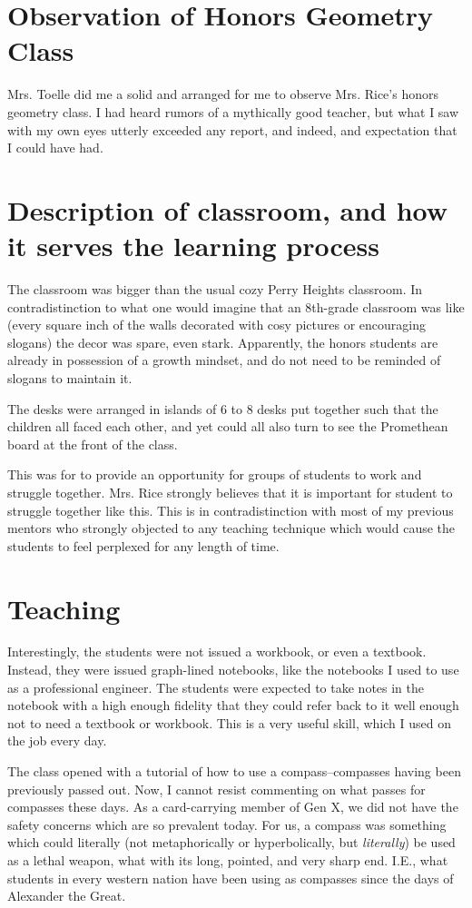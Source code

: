 \documentclass[11pt]{elegantbook}
\begin{document}
\section*{Observation of Honors Geometry Class}

Mrs. Toelle did me a solid and arranged for me to observe Mrs. Rice's
honors geometry class.  I had heard rumors of a mythically good
teacher, but what I saw with my own eyes utterly exceeded any report,
and indeed, and expectation that I could have had.

\section*{Description of classroom, and how it serves the learning process}

The classroom was bigger than the usual cozy Perry Heights classroom.
In contradistinction to what one would imagine that an 8th-grade
classroom was like (every square inch of the walls decorated with cosy
pictures or encouraging slogans) the decor was spare, even stark.
Apparently, the honors students are already in possession of a growth
mindset, and do not need to be reminded of slogans to maintain it.

The desks were arranged in islands of 6 to 8 desks put together such
that the children all faced each other, and yet could all also turn to
see the Promethean board at the front of the class.

This was for to provide an opportunity for groups of students to work
and struggle together.  Mrs. Rice strongly believes that it is
important for student to struggle together like this. This is in
contradistinction with most of my previous mentors who strongly
objected to any teaching technique which would cause the students to
feel perplexed for any length of time.

\section*{Teaching}

Interestingly, the students were not issued a workbook, or even a textbook.
Instead, they were issued graph-lined notebooks, like the notebooks
I used to use as a professional engineer.  The students were expected
to take notes in the notebook with a high enough fidelity that they
could refer back to it well enough not to need a textbook or workbook.
This is a very useful skill, which I used on the job every day.

The class opened with a tutorial of how to use a compass--compasses
having been previously passed out.  Now, I cannot resist commenting on
what passes for compasses these days.  As a card-carrying member of Gen X,
we did not have the safety concerns which are so prevalent today.
For us, a compass was something which could literally (not metaphorically or
hyperbolically, but {\em literally}) be used as a lethal weapon, what with its
long, pointed, and very sharp end.  I.E., what students in every western
nation have been using as compasses since the days of Alexander the Great.
\end{document}
